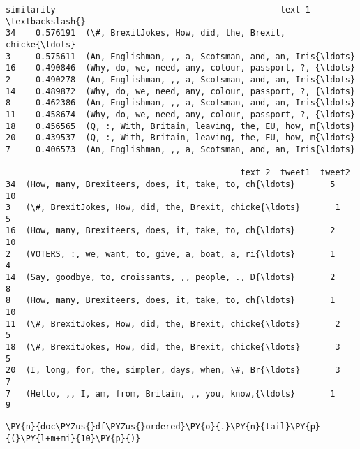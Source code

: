             \begin{tcolorbox}[breakable, size=fbox, boxrule=.5pt, pad at break*=1mm, opacityfill=0]
\begin{Verbatim}[commandchars=\\\{\}]
    similarity                                             text 1  \textbackslash{}
34    0.576191  (\#, BrexitJokes, How, did, the, Brexit, chicke{\ldots}
3     0.575611  (An, Englishman, ,, a, Scotsman, and, an, Iris{\ldots}
16    0.490846  (Why, do, we, need, any, colour, passport, ?, {\ldots}
2     0.490278  (An, Englishman, ,, a, Scotsman, and, an, Iris{\ldots}
14    0.489872  (Why, do, we, need, any, colour, passport, ?, {\ldots}
8     0.462386  (An, Englishman, ,, a, Scotsman, and, an, Iris{\ldots}
11    0.458674  (Why, do, we, need, any, colour, passport, ?, {\ldots}
18    0.456565  (Q, :, With, Britain, leaving, the, EU, how, m{\ldots}
20    0.439537  (Q, :, With, Britain, leaving, the, EU, how, m{\ldots}
7     0.406573  (An, Englishman, ,, a, Scotsman, and, an, Iris{\ldots}

                                               text 2  tweet1  tweet2
34  (How, many, Brexiteers, does, it, take, to, ch{\ldots}       5      10
3   (\#, BrexitJokes, How, did, the, Brexit, chicke{\ldots}       1       5
16  (How, many, Brexiteers, does, it, take, to, ch{\ldots}       2      10
2   (VOTERS, :, we, want, to, give, a, boat, a, ri{\ldots}       1       4
14  (Say, goodbye, to, croissants, ,, people, ., D{\ldots}       2       8
8   (How, many, Brexiteers, does, it, take, to, ch{\ldots}       1      10
11  (\#, BrexitJokes, How, did, the, Brexit, chicke{\ldots}       2       5
18  (\#, BrexitJokes, How, did, the, Brexit, chicke{\ldots}       3       5
20  (I, long, for, the, simpler, days, when, \#, Br{\ldots}       3       7
7   (Hello, ,, I, am, from, Britain, ,, you, know,{\ldots}       1       9
\end{Verbatim}
\end{tcolorbox}
        
    \begin{tcolorbox}[breakable, size=fbox, boxrule=1pt, pad at break*=1mm,colback=cellbackground, colframe=cellborder]
\begin{Verbatim}[commandchars=\\\{\}]
\PY{n}{doc\PYZus{}df\PYZus{}ordered}\PY{o}{.}\PY{n}{tail}\PY{p}{(}\PY{l+m+mi}{10}\PY{p}{)}
\end{Verbatim}
\end{tcolorbox}

